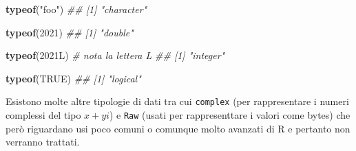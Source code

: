 \documentclass[
]{book}
\newenvironment{Shaded}{\begin{snugshade}}{\end{snugshade}}
\newcommand{\CommentTok}[1]{\textcolor[rgb]{0.56,0.35,0.01}{\textit{#1}}}
\newcommand{\DecValTok}[1]{\textcolor[rgb]{0.00,0.00,0.81}{#1}}
\newcommand{\KeywordTok}[1]{\textcolor[rgb]{0.13,0.29,0.53}{\textbf{#1}}}
\newcommand{\NormalTok}[1]{#1}
\newcommand{\OtherTok}[1]{\textcolor[rgb]{0.56,0.35,0.01}{#1}}
\newcommand{\StringTok}[1]{\textcolor[rgb]{0.31,0.60,0.02}{#1}}
\begin{document}
\begin{Shaded}
\begin{Highlighting}[]
\KeywordTok{typeof}\NormalTok{(}\StringTok{"foo"}\NormalTok{) }
\CommentTok{## [1] "character"}

\KeywordTok{typeof}\NormalTok{(}\DecValTok{2021}\NormalTok{)}
\CommentTok{## [1] "double"}

\KeywordTok{typeof}\NormalTok{(2021L) }\CommentTok{# nota la lettera L}
\CommentTok{## [1] "integer"}

\KeywordTok{typeof}\NormalTok{(}\OtherTok{TRUE}\NormalTok{)}
\CommentTok{## [1] "logical"}
\end{Highlighting}
\end{Shaded}

Esistono molte altre tipologie di dati tra cui \texttt{complex} (per rappresentare i numeri complessi del tipo \(x + yi\)) e \texttt{Raw} (usati per rappresenttare i valori come bytes) che però riguardano usi poco comuni o comunque molto avanzati di R e pertanto non verranno trattati.
\end{document}
